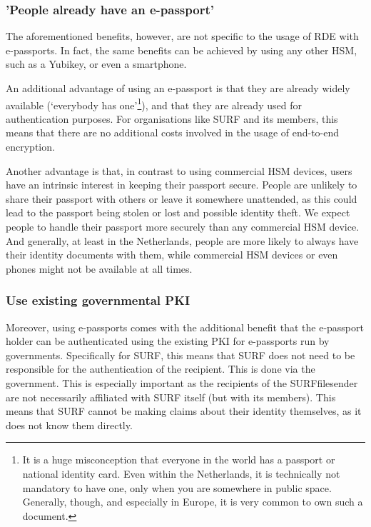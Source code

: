 \subsubsection{'People already have an e-passport'}\label{subsubsec:people-already-have-an-e-passport}
The aforementioned benefits, however, are not specific to the usage of RDE with e-passports.
In fact, the same benefits can be achieved by using any other HSM, such as a Yubikey, or even a smartphone.

An additional advantage of using an e-passport is that they are already widely available (`everybody has one'\footnote{
    It is a huge misconception that everyone in the world has a passport or national identity card.
    Even within the Netherlands, it is technically not mandatory to have one, only when you are somewhere in public space.
    Generally, though, and especially in Europe, it is very common to own such a document.
}), and that they are already used for authentication purposes.
For organisations like SURF and its members, this means that there are no additional costs involved in the usage of end-to-end encryption.

Another advantage is that, in contrast to using commercial HSM devices, users have an intrinsic interest in keeping their passport secure.
People are unlikely to share their passport with others or leave it somewhere unattended, as this could lead to the passport being stolen or lost and possible identity theft.
We expect people to handle their passport more securely than any commercial HSM device.
And generally, at least in the Netherlands, people are more likely to always have their identity documents with them, while commercial HSM devices or even phones might not be available at all times.

\subsubsection{Use existing governmental PKI}\label{subsubsec:use-existing-governmental-pki}
Moreover, using e-passports comes with the additional benefit that the e-passport holder can be authenticated using the existing PKI for e-passports run by governments.
Specifically for SURF, this means that SURF does not need to be responsible for the authentication of the recipient.
This is done via the government.
This is especially important as the recipients of the SURFfilesender are not necessarily affiliated with SURF itself (but with its members).
This means that SURF cannot be making claims about their identity themselves, as it does not know them directly.
